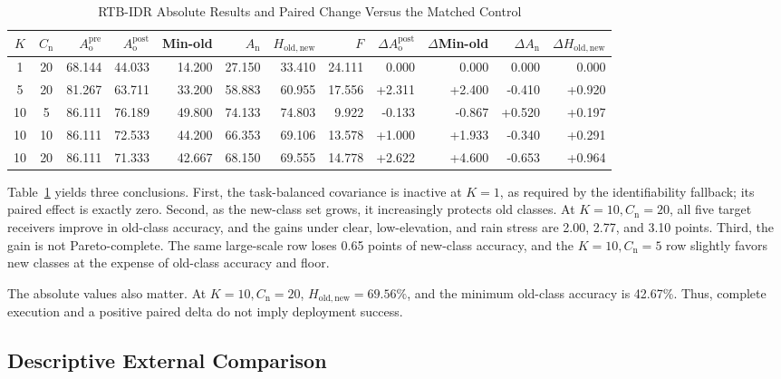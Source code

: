 \documentclass[journal]{IEEEtran}
\newcommand{\stagehead}{RTB-IDR}
\newcommand{\Harm}{H_{\mathrm{old,new}}}
\begin{document}
\begin{table}[t]
\caption{\stagehead{} Absolute Results and Paired Change Versus the Matched Control}
\label{tab:d92}
\centering
\footnotesize
\begin{tabular}{ccrrrrrr|rrrr}
\toprule
\(K\) & \(C_{\mathrm{n}}\) &
\(A_{\mathrm{o}}^{\mathrm{pre}}\) &
\(A_{\mathrm{o}}^{\mathrm{post}}\) &
Min-old & \(A_{\mathrm{n}}\) & \(\Harm\) & \(F\) &
\(\Delta A_{\mathrm{o}}^{\mathrm{post}}\) &
\(\Delta\)Min-old &
\(\Delta A_{\mathrm{n}}\) &
\(\Delta\Harm\) \\
\midrule
1  & 20 & 68.144 & 44.033 & 14.200 & 27.150 & 33.410 & 24.111 & 0.000 & 0.000 & 0.000 & 0.000 \\
5  & 20 & 81.267 & 63.711 & 33.200 & 58.883 & 60.955 & 17.556 & +2.311 & +2.400 & -0.410 & +0.920 \\
10 & 5  & 86.111 & 76.189 & 49.800 & 74.133 & 74.803 & 9.922  & -0.133 & -0.867 & +0.520 & +0.197 \\
10 & 10 & 86.111 & 72.533 & 44.200 & 66.353 & 69.106 & 13.578 & +1.000 & +1.933 & -0.340 & +0.291 \\
10 & 20 & 86.111 & 71.333 & 42.667 & 68.150 & 69.555 & 14.778 & +2.622 & +4.600 & -0.653 & +0.964 \\
\bottomrule
\end{tabular}
\end{table}

Table~\ref{tab:d92} yields three conclusions. First, the task-balanced covariance is inactive at \(K=1\), as required by the identifiability fallback; its paired effect is exactly zero. Second, as the new-class set grows, it increasingly protects old classes. At \(K=10,C_{\mathrm{n}}=20\), all five target receivers improve in old-class accuracy, and the gains under clear, low-elevation, and rain stress are 2.00, 2.77, and 3.10 points. Third, the gain is not Pareto-complete. The same large-scale row loses 0.65 points of new-class accuracy, and the \(K=10,C_{\mathrm{n}}=5\) row slightly favors new classes at the expense of old-class accuracy and floor.

The absolute values also matter. At \(K=10,C_{\mathrm{n}}=20\), \(\Harm=69.56\%\), and the minimum old-class accuracy is 42.67\%. Thus, complete execution and a positive paired delta do not imply deployment success.

\subsection{Descriptive External Comparison}
\end{document}
